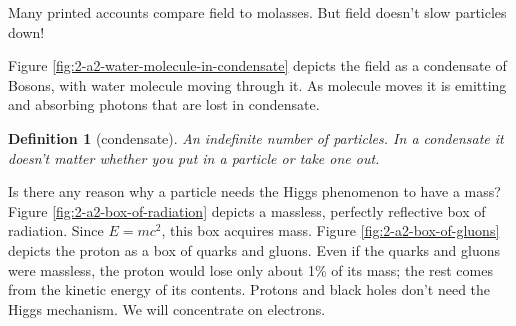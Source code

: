 \documentclass[]{article}
\newtheorem{defn}[thm]{Definition}
\begin{document}
\begin{appendices}
	Many printed accounts compare field to molasses. But field doesn't slow particles down! 

	Figure \ref{fig:2-a2-water-molecule-in-condensate} depicts the field as a condensate of Bosons, with water molecule moving through it. As molecule moves it is emitting and absorbing photons that are lost in condensate.
	
	\begin{defn}[condensate]
		An indefinite number of particles. In a condensate it doesn't matter whether you put in a particle or take one out.
	\end{defn}

	Is there any reason why a particle needs the Higgs phenomenon to have a  mass? Figure \ref{fig:2-a2-box-of-radiation} depicts a massless, perfectly reflective box of radiation. Since $E=mc^2$, this box acquires mass. Figure \ref{fig:2-a2-box-of-gluons} depicts the proton as a box of quarks and gluons. Even if the quarks and gluons were massless, the proton would lose only about 1\% of its mass; the rest comes from the kinetic energy of its contents. Protons and black holes don't need the Higgs mechanism. We will concentrate on electrons.
	

\end{appendices}
\end{document}
